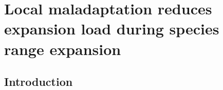 \chapter{Local maladaptation reduces expansion load during species range expansion}
\label{chap:expansionload}






\section{Introduction}

